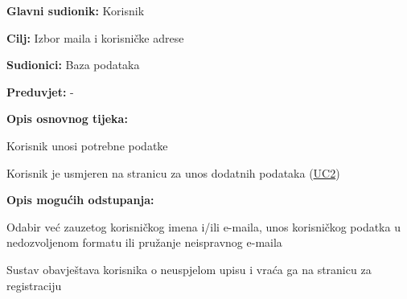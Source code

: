 					\noindent {}
					\begin{packed_item}
	
						\item \textbf{Glavni sudionik:} Korisnik
						\item  \textbf{Cilj:} Izbor maila i korisničke adrese
						\item  \textbf{Sudionici:} Baza podataka
						\item  \textbf{Preduvjet:} -
						\item  \textbf{Opis osnovnog tijeka:}
						
						\item[] \begin{packed_enum}
	
							\item Korisnik unosi potrebne podatke
							\item Korisnik je usmjeren na stranicu za unos dodatnih podataka (\hyperref[UC2] {UC2})
							
						\end{packed_enum}
						
						\item  \textbf{Opis mogućih odstupanja:}
						
						\item[] \begin{packed_item}
	
							\item[1.a] Odabir već zauzetog korisničkog imena i/ili e-maila, unos korisničkog podatka u nedozvoljenom formatu ili pružanje neispravnog e-maila
							\item[] \begin{packed_enum}
								
								\item Sustav obavještava korisnika o neuspjelom upisu i vraća ga na stranicu za registraciju
								
							\end{packed_enum}
							
						\end{packed_item}
					\end{packed_item}
									
